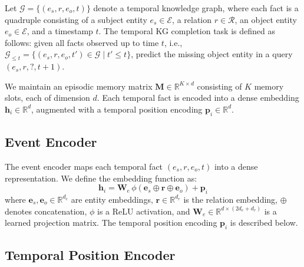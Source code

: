 \documentclass{article}
\begin{document}
Let $\mathcal{G} = \{(e_s, r, e_o, t)\}$ denote a temporal knowledge graph, where each fact is a quadruple consisting of a subject entity $e_s \in \mathcal{E}$, a relation $r \in \mathcal{R}$, an object entity $e_o \in \mathcal{E}$, and a timestamp $t$. The temporal KG completion task is defined as follows: given all facts observed up to time $t$, i.e., $\mathcal{G}_{\leq t} = \{(e_s, r, e_o, t') \in \mathcal{G} \mid t' \leq t\}$, predict the missing object entity in a query $(e_s, r, ?, t+1)$.

We maintain an episodic memory matrix $\mathbf{M} \in \mathbb{R}^{K \times d}$ consisting of $K$ memory slots, each of dimension $d$. Each temporal fact is encoded into a dense embedding $\mathbf{h}_i \in \mathbb{R}^d$, augmented with a temporal position encoding $\mathbf{p}_i \in \mathbb{R}^d$.

\subsection{Event Encoder}
\label{sec:method:encoder}

The event encoder maps each temporal fact $(e_s, r, e_o, t)$ into a dense representation. We define the embedding function as:
\begin{equation}
\mathbf{h}_i = \mathbf{W}_e \, \phi(\mathbf{e}_s \oplus \mathbf{r} \oplus \mathbf{e}_o) + \mathbf{p}_i
\label{eq:event_encoder}
\end{equation}
where $\mathbf{e}_s, \mathbf{e}_o \in \mathbb{R}^{d_e}$ are entity embeddings, $\mathbf{r} \in \mathbb{R}^{d_r}$ is the relation embedding, $\oplus$ denotes concatenation, $\phi$ is a ReLU activation, and $\mathbf{W}_e \in \mathbb{R}^{d \times (2d_e + d_r)}$ is a learned projection matrix. The temporal position encoding $\mathbf{p}_i$ is described below.

\subsection{Temporal Position Encoder}
\label{sec:method:temporal}
\end{document}
